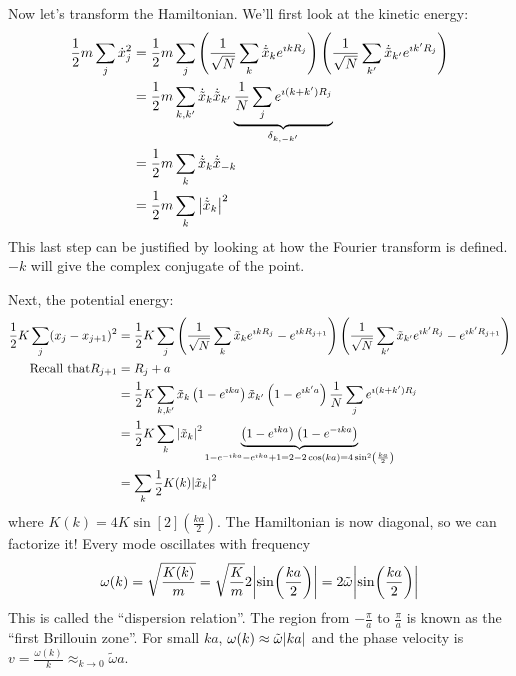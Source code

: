 \documentclass[a4paper,twoside,master.tex]{subfiles}
\begin{document}
Now let's transform the Hamiltonian. We'll first look at the kinetic energy:
\begin{align}
    \frac{1}{2} m \sum_j \dot{x}_j^2 &= \frac{1}{2} m \sum_j \left( \frac{1}{\sqrt{N}} \sum_k \dot{\tilde{x}}_k e^{\imath k R_j} \right)\left( \frac{1}{\sqrt{N}} \sum_{k'} \dot{\tilde{x}}_{k'} e^{\imath k' R_j} \right) \\
    &= \frac{1}{2} m \sum_{k,k'} \dot{\tilde{x}}_{k} \dot{\tilde{x}}_{k'} \underbrace{\frac{1}{N} \sum_j e^{\imath (k+k')R_j}}_{\delta_{k, -k'}} \\
    &= \frac{1}{2} m \sum_{k} \dot{\tilde{x}}_{k} \dot{\tilde{x}}_{-k} \\
    &= \frac{1}{2} m \sum_{k} \abs{\dot{\tilde{x}}_{k}}^2
\end{align}
This last step can be justified by looking at how the Fourier transform is defined. $ -k $ will give the complex conjugate of the point.


Next, the potential energy:
\begin{align}
    \frac{1}{2} K \sum_j (x_j - x_{j + 1})^2 &= \frac{1}{2} K \sum_j \left( \frac{1}{\sqrt{N}} \sum_k \tilde{x}_k e^{\imath k R_j} - e^{\imath k R_{j+1}} \right) \left( \frac{1}{\sqrt{N}} \sum_{k'} \tilde{x}_{k'} e^{\imath k' R_j} - e^{\imath k' R_{j+1}} \right) \\
    \text{Recall that} R_{j+1} &= R_j + a \\
    &= \frac{1}{2} K \sum_{k,k'} \tilde{x}_k \left( 1 - e^{\imath ka} \right) \tilde{x}_{k'} \left( 1 - e^{\imath k' a} \right) \frac{1}{N} \sum_j e^{\imath (k+k') R_j} \\
    &= \frac{1}{2} K \sum_k \abs{\tilde{x}_k}^2 \underbrace{\left( 1 - e^{\imath k a} \right) \left( 1 - e^{- \imath k a} \right)}_{1 - e^{- \imath k a} - e^{\imath k a} + 1 = 2 - 2 \cos(ka) = 4 \sin[2](\frac{ka}{2})} \\
    &= \sum_k \frac{1}{2} K(k) \abs{\tilde{x}_k}^2
\end{align}
where $ K(k) = 4 K \sin[2](\frac{ka}{2}) $. The Hamiltonian is now diagonal, so we can factorize it! Every mode oscillates with frequency
\begin{equation}
    \omega(k) = \sqrt{\frac{K(k)}{m}} = \sqrt{\frac{K}{m}} 2 \abs{\sin(\frac{ka}{2})} = 2 \tilde{\omega} \abs{\sin(\frac{ka}{2})} 
\end{equation}
This is called the ``dispersion relation''. The region from $ - \frac{\pi}{a} $ to $ \frac{\pi}{a} $ is known as the ``first Brillouin zone''. For small $ ka $, $ \omega(k) \approx \tilde{\omega} \abs{ka} $ and the phase velocity is $ v = \frac{\omega(k)}{k} \approx_{k \to 0} \tilde{\omega}a $.
\end{document}
